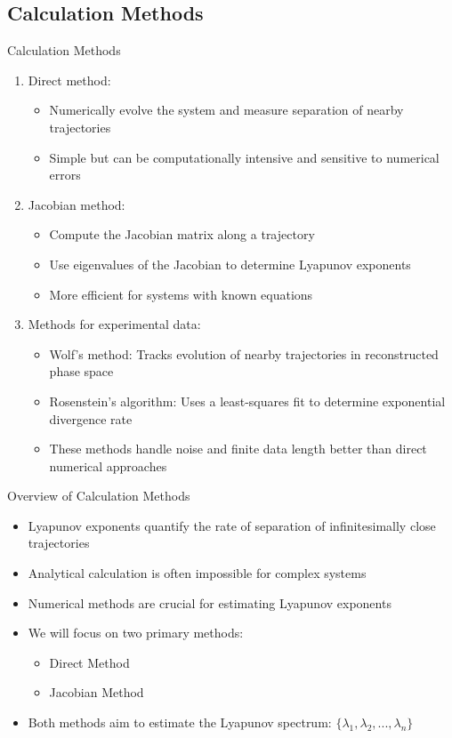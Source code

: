 \documentclass{beamer}
\begin{document}
\subsection{Calculation Methods}
\begin{frame}{Calculation Methods}
\begin{enumerate}
    \item Direct method:
    \begin{itemize}
        \item Numerically evolve the system and measure separation of nearby trajectories
        \item Simple but can be computationally intensive and sensitive to numerical errors
    \end{itemize}
    \item Jacobian method:
    \begin{itemize}
        \item Compute the Jacobian matrix along a trajectory
        \item Use eigenvalues of the Jacobian to determine Lyapunov exponents
        \item More efficient for systems with known equations
    \end{itemize}
    \item Methods for experimental data:
    \begin{itemize}
        \item Wolf's method: Tracks evolution of nearby trajectories in reconstructed phase space
        \item Rosenstein's algorithm: Uses a least-squares fit to determine exponential divergence rate
        \item These methods handle noise and finite data length better than direct numerical approaches
    \end{itemize}
\end{enumerate}
\end{frame}

\begin{frame}{Overview of Calculation Methods}
\begin{itemize}
    \item Lyapunov exponents quantify the rate of separation of infinitesimally close trajectories
    \item Analytical calculation is often impossible for complex systems
    \item Numerical methods are crucial for estimating Lyapunov exponents
    \item We will focus on two primary methods:
    \begin{itemize}
        \item Direct Method
        \item Jacobian Method
    \end{itemize}
    \item Both methods aim to estimate the Lyapunov spectrum: $\{\lambda_1, \lambda_2, ..., \lambda_n\}$
\end{itemize}
\end{frame}
\end{document}

